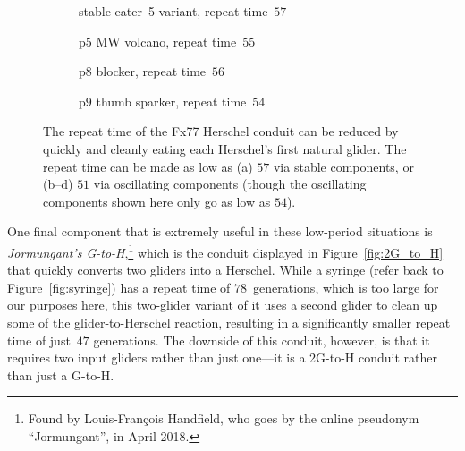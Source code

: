 \begin{figure}[!htb]
	\centering
	\begin{subfigure}{0.25\textwidth}
		\centering
		\caption{stable eater~5 variant, repeat time~$57$}
		\label{fig:fx77_57}
	\end{subfigure} \hfill \begin{subfigure}{.23\textwidth}
		\centering
		\caption{p$5$ MW volcano, repeat time~$55$}
		\label{fig:fx77_p5_eat}
	\end{subfigure} \hfill \begin{subfigure}{.23\textwidth}
		\centering
		\caption{p$8$ blocker, repeat time~$56$}
		\label{fig:fx77_p8_eat}
	\end{subfigure} \hfill \begin{subfigure}{.23\textwidth}
		\centering
		\caption{p$9$ thumb sparker, repeat time~$54$}
		\label{fig:fx77_p9_eat}
	\end{subfigure}
	\caption{The repeat time of the Fx77 Herschel conduit can be reduced by quickly and cleanly eating each Herschel's first natural glider. The repeat time can be made as low as (a) $57$ via stable components, or (b--d) $51$ via oscillating components (though the oscillating components shown here only go as low as $54$).}\label{fig:fx77_fast_eaters}
\end{figure}

One final component that is extremely useful in these low-period situations is \emph{Jormungant's G-to-H},\footnote{Found by Louis-François Handfield, who goes by the online pseudonym ``Jormungant'', in April 2018.} which is the conduit displayed in Figure~\ref{fig:2G_to_H} that quickly converts two gliders into a Herschel. While a syringe (refer back to Figure~\ref{fig:syringe}) has a repeat time of $78$~generations, which is too large for our purposes here, this two-glider variant of it uses a second glider to clean up some of the glider-to-Herschel reaction, resulting in a significantly smaller repeat time of just~$47$ generations. The downside of this conduit, however, is that it requires two input gliders rather than just one---it is a 2G-to-H conduit rather than just a G-to-H.

